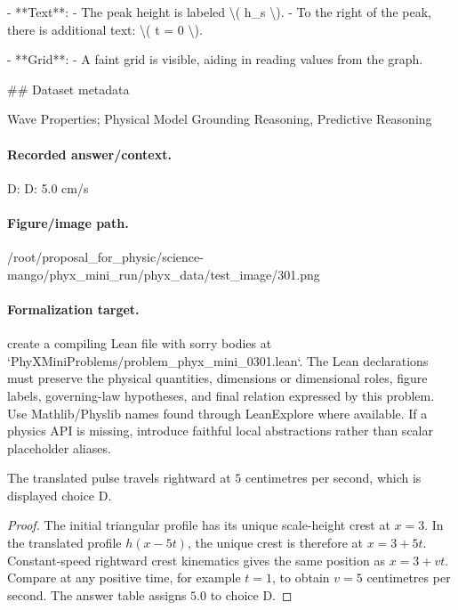 - **Text**:
  - The peak height is labeled \textbackslash{}( h\_s \textbackslash{}).
  - To the right of the peak, there is additional text: \textbackslash{}( t = 0 \textbackslash{}).

- **Grid**:
  - A faint grid is visible, aiding in reading values from the graph.

\#\# Dataset metadata

Wave Properties; Physical Model Grounding Reasoning, Predictive Reasoning

\paragraph{Recorded answer/context.}
D: D: 5.0 cm/s

\paragraph{Figure/image path.}
/root/proposal\_for\_physic/science-mango/phyx\_mini\_run/phyx\_data/test\_image/301.png

\paragraph{Formalization target.}
create a compiling Lean file with sorry bodies at `PhyXMiniProblems/problem\_phyx\_mini\_0301.lean`. The Lean declarations must preserve the physical quantities, dimensions or dimensional roles, figure labels, governing-law hypotheses, and final relation expressed by this problem.
Use Mathlib/Physlib names found through LeanExplore where available. If a physics API is missing, introduce faithful local abstractions rather than scalar placeholder aliases.

\begin{theorem}
\label{thm:physics:phyx_mini_0301:target}
The translated pulse travels rightward at $5$ centimetres per second, which is displayed choice D.
\end{theorem}
\begin{proof}
The initial triangular profile has its unique scale-height crest at $x=3$.  In the translated profile $h(x-5t)$, the unique crest is therefore at $x=3+5t$.  Constant-speed rightward crest kinematics gives the same position as $x=3+vt$.  Compare at any positive time, for example $t=1$, to obtain $v=5$ centimetres per second.  The answer table assigns $5.0$ to choice D.
\end{proof}

